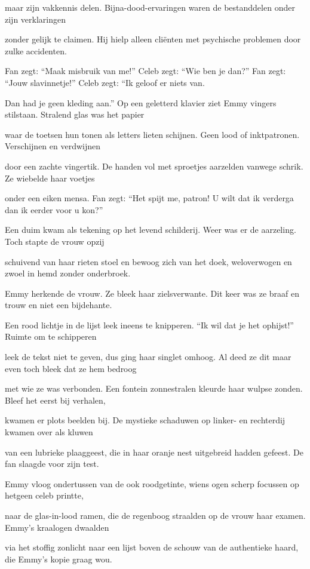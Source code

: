 maar zijn vakkennis delen.
Bijna-dood-ervaringen
waren de bestanddelen
onder zijn verklaringen

zonder gelijk te claimen.
Hij hielp alleen cliënten
met psychische problemen
door zulke accidenten.

Fan zegt: “Maak misbruik van me!”
Celeb zegt: “Wie ben je dan?”
Fan zegt: “Jouw slavinnetje!”
Celeb zegt: “Ik geloof er niets van.

Dan had je geen kleding aan.”
Op een geletterd klavier
ziet Emmy vingers stilstaan.
Stralend glas was het papier

waar de toetsen hun tonen
als letters lieten schijnen.
Geen lood of inktpatronen.
Verschijnen en verdwijnen

door een zachte vingertik.
De handen vol met sproetjes
aarzelden vanwege schrik.
Ze wiebelde haar voetjes

onder een eiken mensa.
Fan zegt: “Het spijt me, patron!
U wilt dat ik verderga
dan ik eerder voor u kon?”

Een duim kwam als tekening
op het levend schilderij.
Weer was er de aarzeling.
Toch stapte de vrouw opzij

schuivend van haar rieten stoel
en bewoog zich van het doek,
weloverwogen en zwoel
in hemd zonder onderbroek.

Emmy herkende de vrouw.
Ze bleek haar zielsverwante.
Dit keer was ze braaf en trouw
en niet een bijdehante.

Een rood lichtje in de lijst
leek ineens te knipperen.
“Ik wil dat je het ophijst!”
Ruimte om te schipperen

leek de tekst niet te geven,
dus ging haar singlet omhoog.
Al deed ze dit maar even
toch bleek dat ze hem bedroog

met wie ze was verbonden.
Een fontein zonnestralen
kleurde haar wulpse zonden.
Bleef het eerst bij verhalen,

kwamen er plots beelden bij.
De mystieke schaduwen
op linker- en rechterdij
kwamen over als kluwen

van een lubrieke plaaggeest,
die in haar oranje nest
uitgebreid hadden gefeest.
De fan slaagde voor zijn test.

Emmy vloog ondertussen
van de ook roodgetinte,
wiens ogen scherp focussen
op hetgeen celeb printte,

naar de glas-in-lood ramen,
die de regenboog straalden
op de vrouw haar examen.
Emmy’s kraalogen dwaalden

via het stoffig zonlicht
naar een lijst boven de schouw
van de authentieke haard,
die Emmy’s kopie graag wou.

